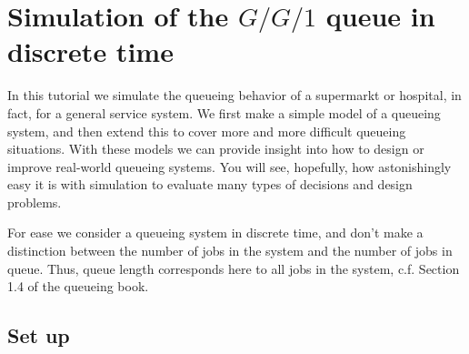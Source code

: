 \documentclass{scrartcl}
\begin{document}




\clearpage


\section{Simulation of the $G/G/1$ queue in discrete time}
\label{sec:single-server-queue}

In this tutorial we simulate the queueing behavior of a supermarkt or hospital, in fact, for a general service system. We first make a simple model of a queueing system, and then extend this to cover more and more difficult queueing situations. With these models we can provide insight into how to design or improve real-world queueing systems.  You will see, hopefully, how astonishingly easy it is with simulation to evaluate many types of decisions and design problems.  

For ease we  consider a queueing system in discrete time, and don't make a distinction between the number of jobs in the system and the number of jobs in queue. Thus, queue length corresponds here to all jobs in the system, c.f. Section 1.4 of the queueing book. 

\subsection{Set up}
\label{sec:set-up}
\end{document}
